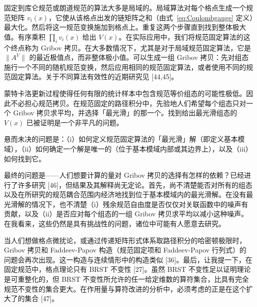 固定到库仑规范或朗道规范的算法大多是局域的。局域算法对每个格点生成一个规范矩阵 $v_i(x)$，它使从该格点出发的链矩阵之和（由式~\ref{eq:Coulombgauge} 定义）最大化。然后将这一规范变换施加到格点上。重复这两个步骤直到找到整体极大值。有序乘积 $\prod_i v_i(x)$ 给出 $V(x)$。在实际应用中，我们将规范固定算法的这个终点称为 Gribov 拷贝。在大多数情况下，尤其是对于局域规范固定算法，它是 $\lVert A^V \rVert$ 的最近极值点，而非整体极小值。可以生成一组 Gribov 拷贝：先对组态施行一个不同的随机规范变换，然后应用相同的规范固定算法，或者使用不同的规范固定算法。关于不同算法有效性的近期研究见 [44,45]。

蒙特卡洛更新过程使得任何有限的统计样本中包含规范等价组态的可能性极低。因此不必担心规范拷贝。在规范固定的路径积分中，先验地人们希望每个组态只对一个 Gribov 拷贝求平均，并选择「最光滑」的那一个。找到给出最光滑组态的 $V(x)$ 已被证明是一个非平凡的问题。

悬而未决的问题是：（i）如何定义规范固定算法的「最光滑」解（即定义基本模域），（ii）如何确定一个解是唯一的（位于基本模域内部或其边界上），以及（iii）如何找到它。

最终的问题是——人们想要计算的量对 Gribov 拷贝的选择有怎样的依赖？已经进行了许多研究 [46]，但结果及其解释尚无定论。首先，尚不清楚能否对所有的组态以及在所研究的规范耦合范围内经济地找到位于基本模域内的最光滑解。在没有最光滑解的情况下，也不清楚（i）残余规范自由度是否仅仅对关联函数中的噪声有贡献，以及（ii）是否应对每个组态的一组 Gribov 拷贝求平均以减小这种噪声。在我看来，这些仍然是具有挑战性的问题，诸位中可能有人愿意去研究。

当人们想做格点微扰论，或通过传递矩阵形式体系取路径积分的哈密顿极限时，Gribov 拷贝和 Faddeev-Papov 构造（规范固定项和 Faddeev-Papov 行列式）的问题会再次出现。这一构造与连续情形中的构造类似 [36]。最后，让我提一下，在固定规范中，格点理论只有 BRST 不变性 [27]。虽然 BRST 不变性足以证明理论是可重整化的，但 BRST 不变性所允许的任一给定维数的算符集合，比具有完全规范不变性的集合更大。在作用量与算符改进的分析中，必须考虑的正是在这个扩大了的集合 [47]。

